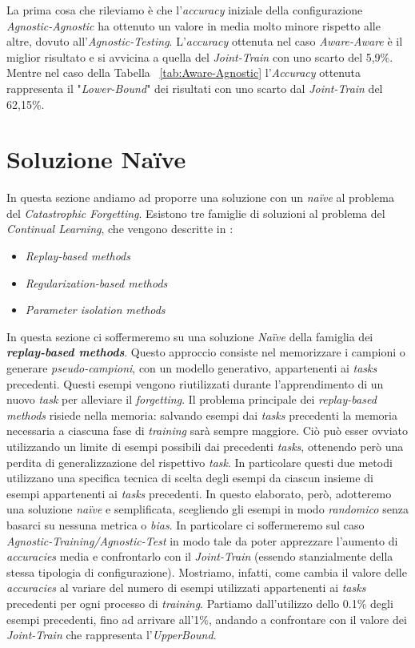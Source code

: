 La prima cosa che rileviamo è che l'\textit{accuracy} iniziale della configurazione \textit{Agnostic-Agnostic} ha ottenuto un valore in media molto minore rispetto alle altre, dovuto all'\textit{Agnostic-Testing}.
L'\textit{accuracy} ottenuta nel caso \textit{Aware-Aware} è il miglior risultato e si avvicina a quella del \textit{Joint-Train} con uno scarto del 5,9\%. Mentre nel caso della Tabella ~\ref{tab:Aware-Agnostic} l'\textit{Accuracy} ottenuta rappresenta il "\textit{Lower-Bound}" dei risultati con uno scarto dal \textit{Joint-Train} del 62,15\%. 
\section{Soluzione Naïve}
In questa sezione andiamo ad proporre una soluzione con un \textit{naïve} al problema del \textit{Catastrophic Forgetting}. Esistono tre famiglie di soluzioni al problema del \textit{Continual Learning}, che vengono descritte in \cite{Continual_Learning}:
\begin{itemize}
    \item \textit{Replay-based methods}
    \item \textit{Regularization-based methods}
    \item\textit{Parameter isolation methods}
\end{itemize}
In questa sezione ci soffermeremo su una soluzione \textit{Naïve} della famiglia dei \textit{\textbf{replay-based methods}}. Questo approccio consiste nel memorizzare i campioni o generare \textit{pseudo-campioni}, con un modello generativo, appartenenti ai \textit{tasks} precedenti. Questi esempi  vengono riutilizzati durante l'apprendimento di un nuovo \textit{task} per alleviare il \textit{forgetting}.\newline
Il problema principale dei \textit{replay-based methods} risiede nella memoria: salvando esempi dai \textit{tasks} precedenti la memoria necessaria a ciascuna fase di \textit{training} sarà sempre maggiore. Ciò può esser ovviato utilizzando un limite di esempi possibili dai precedenti \textit{tasks}, ottenendo però una perdita di generalizzazione del rispettivo \textit{task}.
In particolare questi due metodi utilizzano una specifica tecnica di scelta degli esempi da ciascun insieme di esempi appartenenti ai \textit{tasks} precedenti.\newline
In questo elaborato, però, adotteremo una soluzione \textit{naïve} e semplificata, scegliendo gli esempi in modo \textit{randomico} senza basarci su nessuna metrica o \textit{bias}.
In particolare ci soffermeremo sul caso \textit{Agnostic-Training/Agnostic-Test} in modo tale da poter apprezzare l'aumento di \textit{accuracies} media e confrontarlo con il \textit{Joint-Train} (essendo stanzialmente della stessa tipologia di configurazione). Mostriamo, infatti, come cambia il valore delle \textit{accuracies} al variare del numero di esempi utilizzati appartenenti ai \textit{tasks} precedenti per ogni processo di \textit{training}. Partiamo dall'utilizzo dello 0.1\% degli esempi precedenti, fino ad arrivare all'1\%, andando a confrontare con il valore dei \textit{Joint-Train} che rappresenta l'\textit{UpperBound}.
